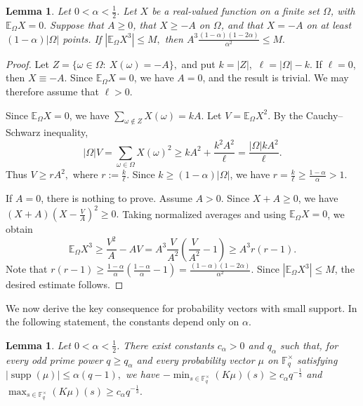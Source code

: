 \documentclass[11pt]{article}
\newtheorem{lemma}[theorem]{Lemma}
\newcommand{\1}{\mathbf{1}}
\begin{document}
\begin{lemma}\label{lem-4}
	Let \(0<\alpha<\frac12\). Let \(X\) be a real-valued function on a finite set \(\Omega\), with $\mathbb{E}_\Omega X=0.$
	Suppose that \(A\ge0\), that $	X\ge -A$
	on \(\Omega\), and that $X=-A$
	on at least \((1-\alpha)|\Omega|\) points. If $|\mathbb{E}_\Omega X^3|\le M,$
	then $	A^3\frac{(1-\alpha)(1-2\alpha)}{\alpha^2}
	\le M.$
\end{lemma}

\begin{proof}
	Let $Z=\{\omega\in\Omega:\ X(\omega)=-A\},$
	and put $k=|Z|,$ $\ell=|\Omega|-k.$
	If \(\ell=0\), then \(X\equiv -A\). Since \(\mathbb{E}_\Omega X=0\), we have \(A=0\), and the result is trivial. We may therefore assume that \(\ell>0\).
	
	Since \(\mathbb{E}_\Omega X=0\), we have $\sum_{\omega\notin Z}X(\omega)=kA.$
	Let $V=\mathbb{E}_\Omega X^2.$
	By the Cauchy--Schwarz inequality,
	\[
	|\Omega|V
	=
	\sum_{\omega\in\Omega}X(\omega)^2
	\ge
	kA^2+\frac{k^2A^2}{\ell}
	=
	\frac{|\Omega|kA^2}{\ell}.
	\]
	Thus $V\ge rA^2,$ where $r:=\frac{k}{\ell}.$
	Since \(k\ge(1-\alpha)|\Omega|\), we have $	r=\frac{k}{\ell}\ge\frac{1-\alpha}{\alpha}>1.$
	
	If \(A=0\), there is nothing to prove. Assume \(A>0\). Since \(X+A\ge0\), we have $(X+A)\left(X-\frac{V}{A}\right)^2\ge0.$
	Taking normalized averages and using \(\mathbb{E}_\Omega X=0\), we obtain
	\[
	\mathbb{E}_\Omega X^3
	\ge
	\frac{V^2}{A}-AV=A^3\frac{V}{A^2}\left(\frac{V}{A^2}-1\right)
	\ge
	A^3 r(r-1).
	\]
	Note that $r(r-1)
	\ge
	\frac{1-\alpha}{\alpha}
	\left(
	\frac{1-\alpha}{\alpha}-1
	\right)
	=
	\frac{(1-\alpha)(1-2\alpha)}{\alpha^2}.$
	Since \(|\mathbb{E}_\Omega X^3|\le M\), the desired estimate follows.
\end{proof}

We now derive the key consequence for probability vectors with small support. In the following statement, the constants depend only on \(\alpha\).

\begin{lemma}\label{lem-5}
	Let \(0<\alpha<\frac12\). There exist constants \(c_\alpha>0\) and \(q_\alpha\) such that, for every odd prime power \(q\ge q_\alpha\) and every probability vector \(\mu\) on \(\mathbb{F}_q^\times\) satisfying $|\operatorname{supp}(\mu)|\le \alpha(q-1),$
	we have $-\min_{s\in\mathbb{F}_q^\times}(K\mu)(s)
	\ge
	c_\alpha q^{-\frac{1}{3}}$
	and $\max_{s\in\mathbb{F}_q^\times}(K\mu)(s)
	\ge
	c_\alpha q^{-\frac{1}{3}}.$
\end{lemma}
\end{document}

